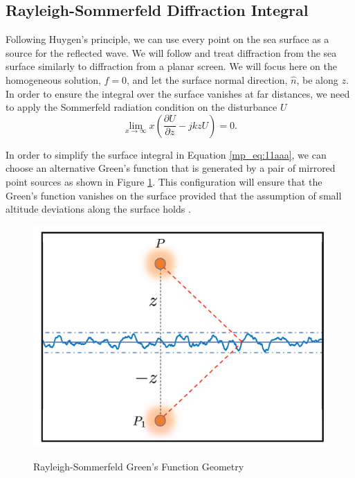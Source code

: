 \subsection{Rayleigh-Sommerfeld Diffraction Integral}
Following Huygen's principle, we can use every point on the sea surface as a source for the reflected wave. We will follow \cite{goodman_fourier} and treat diffraction from the sea surface similarly to diffraction from a planar screen. We will focus here on the homogeneous solution, $f=0$, and let the surface normal direction, $\hat{n}$, be along $z$. In order to ensure the integral over the surface vanishes at far distances, we need to apply the Sommerfeld radiation condition on the disturbance $U$
\begin{equation}
 \lim_{x\to\infty} x\left(\frac{\partial U}{\partial z} -jkzU \right) = 0.
\label{mp_eq:11aaaa}
\end{equation}
\renewcommand{\baselinestretch}{2} \small\normalsize

In order to simplify the surface integral in Equation \ref{mp_eq:11aaa}, we can choose an alternative Green's function that is generated by a pair of mirrored point sources as shown in Figure \ref{mp_fig:2a}. This configuration will ensure that the Green's function vanishes on the surface provided that the assumption of small altitude deviations along the surface holds \cite{goodman_fourier}.

\begin{figure}[H]
  \begin{center}
\includegraphics[width=5in]{../media/analysis/rayleigh_sommerfeld_gf_geometry.png}
  \end{center}
  \renewcommand{\baselinestretch}{1} \small\normalsize
  \begin{quote}
    \caption[Rayleigh-Sommerfeld Green's Function Geometry]{Rayleigh-Sommerfeld Green's Function Geometry\label{mp_fig:2a}}
  \end{quote}
\end{figure}
\renewcommand{\baselinestretch}{2} \small\normalsize

